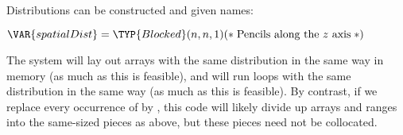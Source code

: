Distributions can be constructed and given names:
\begin{Fortress}
\(\VAR{spatialDist} = \TYP{Blocked}(n,n,1)     \mathtt{(*}\;\hbox{\rm  Pencils along the $z$ axis \unskip}\;\mathtt{*)}\)
\end{Fortress}
The system will lay out arrays with the same distribution in the same
way in memory (as much as this is feasible), and will run loops with
the same distribution in the same way (as much as this is feasible).
By contrast, if we replace every occurrence of  by
, this code will likely divide up arrays and
ranges into the same-sized pieces as above, but these pieces need not
be collocated.
